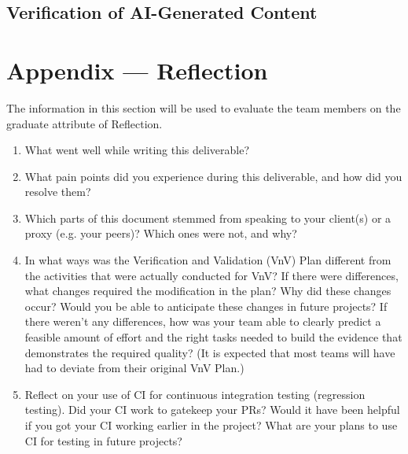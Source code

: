 \documentclass[12pt, titlepage]{article}
\begin{document}


\subsection{Verification of AI-Generated Content}


\newpage{}

\section{Appendix --- Reflection}

The information in this section will be used to evaluate the team members on the
graduate attribute of Reflection.



\begin{enumerate}
  \item What went well while writing this deliverable? 
  \item What pain points did you experience during this deliverable, and how
    did you resolve them?
  \item Which parts of this document stemmed from speaking to your client(s) or
  a proxy (e.g. your peers)? Which ones were not, and why?
  \item In what ways was the Verification and Validation (VnV) Plan different
  from the activities that were actually conducted for VnV?  If there were
  differences, what changes required the modification in the plan?  Why did
  these changes occur?  Would you be able to anticipate these changes in future
  projects?  If there weren't any differences, how was your team able to clearly
  predict a feasible amount of effort and the right tasks needed to build the
  evidence that demonstrates the required quality?  (It is expected that most
  teams will have had to deviate from their original VnV Plan.)
  \item Reflect on your use of CI for continuous integration testing (regression
  testing). Did your CI work to gatekeep your PRs?  Would it have been helpful
  if you got your CI working earlier in the project?  What are your plans to use
  CI for testing in future projects?
\end{enumerate}
\end{document}
